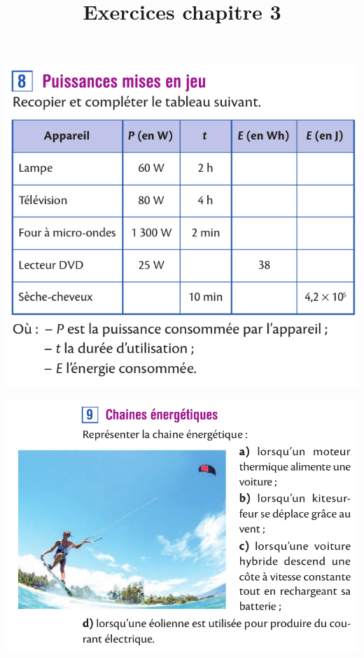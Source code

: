 \documentclass[10pt]{article}
\newcommand{\scalingby}{0.36}
\newcommand{\titreActivite}{\huge Exercices chapitre 3} %
\begin{document}
\date{}
\title{\titreActivite}
\maketitle %


\begin{minipage}[c]{0.45\textwidth}
	\includegraphics[scale=\scalingby]{8.png}
\end{minipage}
\begin{minipage}[c]{0.45\textwidth}
	\includegraphics[scale=\scalingby]{9.png}
\end{minipage}
\end{document}
